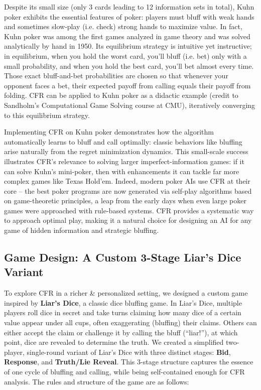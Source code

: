 \documentclass[
]{article}
\begin{document}
Despite its small size (only 3 cards leading to 12 information sets in
total), Kuhn poker exhibits the essential features of poker: players
must bluff with weak hands and sometimes slow-play (i.e. check) strong
hands to maximize value. In fact, Kuhn poker was among the first games
analyzed in game theory and was solved analytically by hand in 1950. Its
equilibrium strategy is intuitive yet instructive; in equilibrium, when
you hold the worst card, you'll bluff (i.e. bet) only with a small
probability, and when you hold the best card, you'll bet almost every
time. Those exact bluff-and-bet probabilities are chosen so that
whenever your opponent faces a bet, their expected payoff from calling
equals their payoff from folding. CFR can be applied to Kuhn poker as a
didactic example (credit to Sandholm's Computational Game Solving course
at CMU), iteratively converging to this equilibrium strategy.

Implementing CFR on Kuhn poker demonstrates how the algorithm
automatically learns to bluff and call optimally: classic behaviors like
bluffing arise naturally from the regret minimization dynamics. This
small-scale success illustrates CFR's relevance to solving larger
imperfect-information games: if it can solve Kuhn's mini-poker, then
with enhancements it can tackle far more complex games like Texas
Hold'em. Indeed, modern poker AIs use CFR at their core -- the best
poker programs are now generated via self-play algorithms based on
game-theoretic principles, a leap from the early days when even large
poker games were approached with rule-based systems. CFR provides a
systematic way to approach optimal play, making it a natural choice for
designing an AI for any game of hidden information and strategic
bluffing.

\subsection{\texorpdfstring{\textbf{Game Design: A Custom 3-Stage Liar's
Dice
Variant}}{Game Design: A Custom 3-Stage Liar's Dice Variant}}\label{game-design-a-custom-3-stage-liars-dice-variant}

To explore CFR in a richer \& personalized setting, we designed a custom
game inspired by \textbf{Liar's Dice}, a classic dice bluffing game. In
Liar's Dice, multiple players roll dice in secret and take turns
claiming how many dice of a certain value appear under all cups, often
exaggerating (bluffing) their claims. Others can either accept the claim
or challenge it by calling the bluff (``liar!''), at which point, dice
are revealed to determine the truth. We created a simplified two-player,
single-round variant of Liar's Dice with three distinct stages:
\textbf{Bid}, \textbf{Response}, and \textbf{Truth/Lie Reveal}. This
3-stage structure captures the essence of one cycle of bluffing and
calling, while being self-contained enough for CFR analysis. The rules
and structure of the game are as follows:
\end{document}
